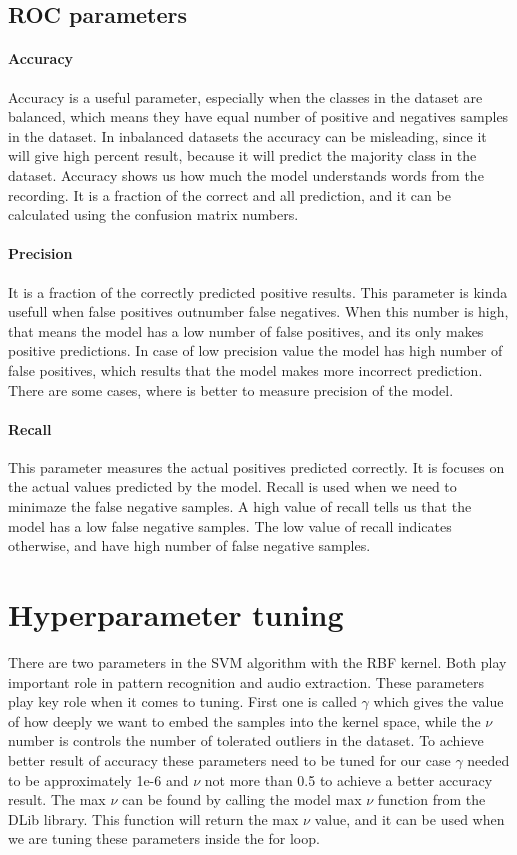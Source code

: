 \documentclass[english,12pt,oneside,a4paper]{article}
\begin{document}
		\subsection{ROC parameters}
		\paragraph{Accuracy}
		Accuracy is a useful parameter, especially when the classes in the dataset are balanced, which means they have equal number of positive and negatives samples in the dataset. In inbalanced datasets the accuracy can be misleading, since it will give high percent result, because it will predict the majority class in the dataset. Accuracy shows us how much the model understands words from the recording. It is a fraction of the correct and all prediction, and it can be calculated using the confusion matrix numbers.
		\paragraph{Precision}
		It is a fraction of the correctly predicted positive results. This parameter is kinda usefull when false positives outnumber false negatives. When this number is high, that means the model has a low number of false positives, and its only makes positive predictions. In case of low precision value the model has high number of false positives, which results that the model makes more incorrect prediction. There are some cases, where is better to measure precision of the model.
		\paragraph{Recall}
		This parameter measures the actual positives predicted correctly. It is focuses on the actual values predicted by the model. Recall is used when we need to minimaze the false negative samples. A high value of recall tells us that the model has a low false negative samples. The low value of recall indicates otherwise, and have high number of false negative samples.
		\section{Hyperparameter tuning}
		There are two parameters in the SVM algorithm with the RBF kernel. Both play important role in pattern recognition and audio extraction. These parameters play key role when it comes to tuning. First one is called $\gamma$ which gives the value of how deeply we want to embed the samples into the kernel space, while the $\nu$ number is controls the number of tolerated outliers in the dataset. To achieve better result of accuracy these parameters need to be tuned for our case  $\gamma$ needed to be approximately 1e-6 and $\nu$ not more than 0.5 to achieve a better accuracy result. The max $\nu$ can be found by calling the model max $\nu$ function from the DLib library.
		This function will return the max $\nu$ value, and it can be used when we are tuning these parameters inside the for loop.
\end{document}
